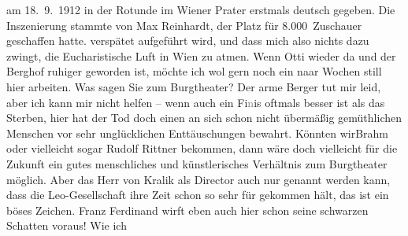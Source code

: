\begin{ledgroupsized}[t]{13cm}
{{{                  am 18. 9. 1912 in der Rotunde
               im Wiener Prater erstmals deutsch gegeben. Die Inszenierung stammte von
                  Max Reinhardt, der Platz für 8.000 Zuschauer
                  geschaffen hatte.}}}\label{K_L03559-1h} verspätet aufgeführt wird, und dass mich also
               nichts dazu zwingt, die Eucharistische Luft in Wien zu atmen. Wenn Otti wieder da
               und der Berghof ruhiger geworden ist, möchte ich
               wol gern noch ein naar Wochen still hier arbeiten. Was sagen Sie zum Burgtheater? Der arme Berger tut mir leid, aber ich kann mir nicht helfen – wenn auch ein
                  Fi\textcolor{gray}{n}is oftmals besser ist als das Sterben, hier hat der Tod doch
               einen an sich schon nicht übermäßig gemüthlichen Menschen vor sehr unglücklichen
               Enttäuschungen bewahrt. Könnten wirBrahm oder
               vielleicht sogar Rudolf Rittner bekommen, dann
               wäre doch vielleicht für die Zukunft ein gutes menschliches und künstlerisches
               Verhältnis zum Burgtheater möglich. Aber das Herr
                  von Kralik als Director auch nur genannt
               werden {\pb}kann, dass die Leo-Gesellschaft ihre Zeit schon so sehr für
               gekommen hält, das ist ein böses Zeichen. Franz
                  Ferdinand wirft eben auch hier schon seine schwarzen Schatten voraus! Wie ich

\end{ledgroupsized}
